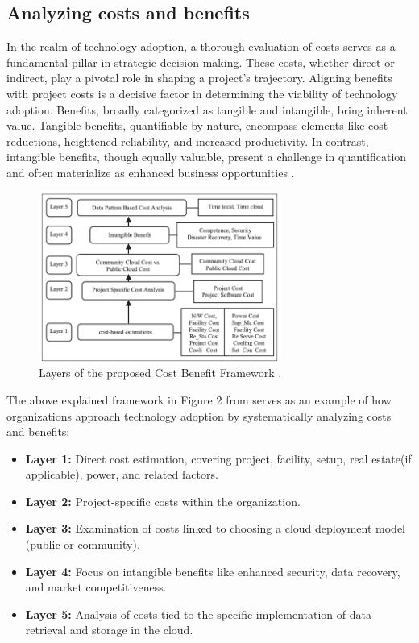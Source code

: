 \documentclass{article}
\begin{document}
\subsection{Analyzing costs and benefits}
In the realm of technology adoption, a thorough evaluation of costs serves as a fundamental pillar in strategic decision-making. These costs, whether direct or indirect, play a pivotal role in shaping a project's trajectory. Aligning benefits with project costs is a decisive factor in determining the viability of technology adoption. Benefits, broadly categorized as tangible and intangible, bring inherent value. Tangible benefits, quantifiable by nature, encompass elements like cost reductions, heightened reliability, and increased productivity. In contrast, intangible benefits, though equally valuable, present a challenge in quantification and often materialize as enhanced business opportunities \cite{reference3}.

\begin{figure}[h]
    \centering
    \includegraphics[width=0.7\textwidth]{Figure2.png}
    \caption{Layers of the proposed Cost Benefit Framework \cite{reference3}.}
    \label{fig:conceptual-model}
\end{figure}

\noindent The above explained framework in Figure 2 from \cite{reference3} serves as an example of how organizations approach technology adoption by systematically analyzing costs and benefits:
\begin{itemize}
    \item \textbf{Layer 1:} Direct cost estimation, covering project, facility, setup, real estate(if applicable), power, and related factors.
    \item \textbf{Layer 2:} Project-specific costs within the organization.
    \item \textbf{Layer 3:} Examination of costs linked to choosing a cloud deployment model (public or community).
    \item \textbf{Layer 4:} Focus on intangible benefits like enhanced security, data recovery, and market competitiveness.
    \item \textbf{Layer 5:} Analysis of costs tied to the specific implementation of data retrieval and storage in the cloud.
\end{itemize}
\end{document}
